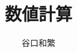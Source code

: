 \documentclass[a4paper,12pt]{jsbook}
\theoremstyle{definition}
\begin{document}
\title{数値計算}
\author{谷口和繁}
\maketitle
\tableofcontents


\end{document}
